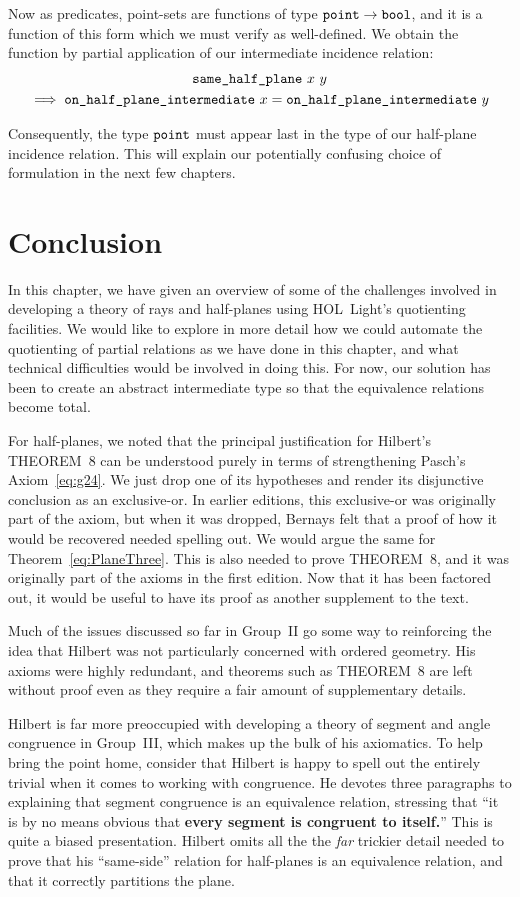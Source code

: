 Now as predicates, point-sets are functions of type $\texttt{point} \rightarrow \texttt{bool}$, and it is a function of this form which we must verify as well-defined. We obtain the function by partial application of our intermediate incidence relation:
\begin{multline}
\texttt{same\_half\_plane}\ x\ y\\ \implies \texttt{on\_half\_plane\_intermediate}\ x = \texttt{on\_half\_plane\_intermediate}\ y
\end{multline}

Consequently, the type $\texttt{point}$ must appear last in the type of our half-plane incidence relation. This will explain our potentially confusing choice of formulation in the next few chapters.

\section{Conclusion}
In this chapter, we have given an overview of some of the challenges involved in developing a theory of rays and half-planes using HOL~Light's quotienting facilities. We would like to explore in more detail how we could automate the quotienting of partial relations as we have done in this chapter, and what technical difficulties would be involved in doing this. For now, our solution has been to create an abstract intermediate type so that the equivalence relations become total.

For half-planes, we noted that the principal justification for Hilbert's THEOREM~8 can be understood purely in terms of strengthening Pasch's Axiom~\eqref{eq:g24}. We just drop one of its hypotheses and render its disjunctive conclusion as an exclusive-or. In earlier editions, this exclusive-or was originally part of the axiom, but when it was dropped, Bernays felt that a proof of how it would be recovered needed spelling out. We would argue the same for Theorem~\ref{eq:PlaneThree}. This is also needed to prove THEOREM~8, and it was originally part of the axioms in the first edition. Now that it has been factored out, it would be useful to have its proof as another supplement to the text.

Much of the issues discussed so far in Group~II go some way to reinforcing the idea that Hilbert was not particularly concerned with ordered geometry. His axioms were highly redundant, and theorems such as THEOREM~8 are left without proof even as they require a fair amount of supplementary details. 

Hilbert is far more preoccupied with developing a theory of segment and angle congruence in Group~III, which makes up the bulk of his axiomatics. To help bring the point home, consider that Hilbert is happy to spell out the entirely trivial when it comes to working with congruence. He devotes three paragraphs to explaining that segment congruence is an equivalence relation, stressing that ``it is by no means obvious that {\bfseries every segment is congruent to itself.}'' This is quite a biased presentation. Hilbert omits all the the \emph{far} trickier detail needed to prove that his ``same-side'' relation for half-planes is an equivalence relation, and that it correctly partitions the plane.

